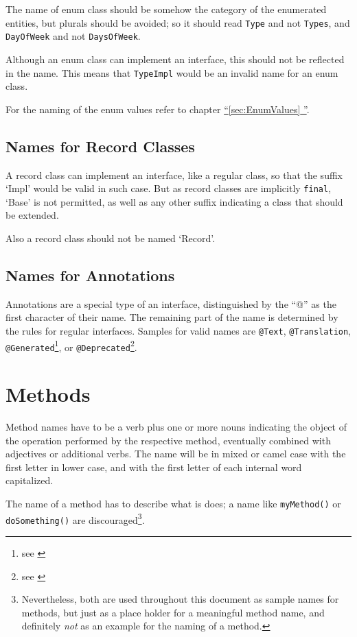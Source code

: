\documentclass[12pt,a4paper,titlepage, parskip=half, headsepline, footsepline, cleardoubleplain]{scrbook}
\newcommand*{\tqfullref}[1]{\hyperref[{#1}]{“\ref*{#1} \nameref*{#1}”}}
\begin{document}
The name of enum class should be somehow the category of the enumerated entities, but plurals should be avoided; so it should read \lstinline|Type| and not \lstinline|Types|, and \lstinline|DayOfWeek| and not \lstinline|DaysOfWeek|.

Although an enum class can implement an interface, this should not be reflected in the name. This means that \lstinline|TypeImpl| would be an invalid name for an enum class.

For the naming of the enum values refer to chapter \tqfullref{sec:EnumValues}.

\subsection{Names for Record Classes}\label{sec:NamesForRecordClasses}
A record class can implement an interface, like a regular class, so that the suffix ‘Impl’ would be valid in such case. But as record classes are implicitly \lstinline|final|, ‘Base’ is not permitted, as well as any other suffix indicating a class that should be extended.

Also a record class should not be named ‘Record’.

\subsection{Names for Annotations}\label{sec:NamesForAnnotations}
Annotations are a special type of an interface, distinguished by the “@” as the first character of their name. The remaining part of the name is determined by the rules for regular interfaces. Samples for valid names are \lstinline|@Text|, \lstinline|@Translation|, \lstinline|@Generated|\footnote{see \autocite{ORACLE_DOC_GENERATED_ANNOTATION}}, or \lstinline|@Deprecated|\footnote{see \autocite{ORACLE_DOC_DEPRECATED_ANNOTATION}}.

\section{Methods}\label{sec:NamesForMethods}
Method names have to be a verb plus one or more nouns indicating the object of the operation performed by the respective method, eventually combined with adjectives or additional verbs. The name will be in mixed or camel case with the first letter in lower case, and with the first letter of each internal word capitalized.

The name of a method has to describe what is does; a name like \lstinline|myMethod()| or \lstinline|doSomething()| are discouraged\footnote{Nevertheless, both are used throughout this document as sample names for methods, but just as a place holder for a meaningful method name, and definitely \textit{not} as an example for the naming of a method.}.
\end{document}
